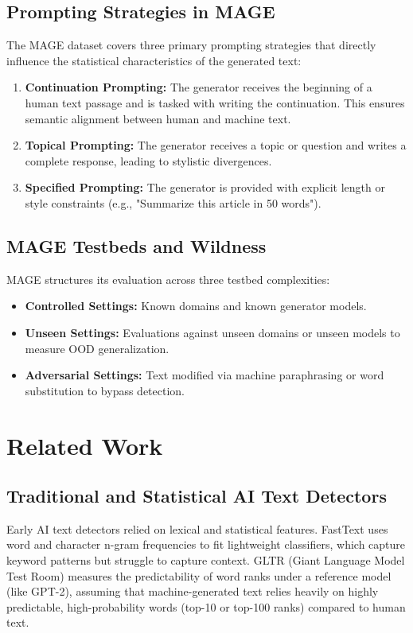 \documentclass[12pt,a4paper]{report}
\begin{document}
\section{Prompting Strategies in MAGE}
The MAGE dataset covers three primary prompting strategies that directly influence the statistical characteristics of the generated text:
\begin{enumerate}
    \item \textbf{Continuation Prompting:} The generator receives the beginning of a human text passage and is tasked with writing the continuation. This ensures semantic alignment between human and machine text.
    \item \textbf{Topical Prompting:} The generator receives a topic or question and writes a complete response, leading to stylistic divergences.
    \item \textbf{Specified Prompting:} The generator is provided with explicit length or style constraints (e.g., "Summarize this article in 50 words").
\end{enumerate}

\section{MAGE Testbeds and Wildness}
MAGE structures its evaluation across three testbed complexities:
\begin{itemize}
    \item \textbf{Controlled Settings:} Known domains and known generator models.
    \item \textbf{Unseen Settings:} Evaluations against unseen domains or unseen models to measure OOD generalization.
    \item \textbf{Adversarial Settings:} Text modified via machine paraphrasing or word substitution to bypass detection.
\end{itemize}

\chapter{Related Work}
\label{ch:related}

\section{Traditional and Statistical AI Text Detectors}
Early AI text detectors relied on lexical and statistical features. FastText \cite{joulin2016bag} uses word and character n-gram frequencies to fit lightweight classifiers, which capture keyword patterns but struggle to capture context. GLTR (Giant Language Model Test Room) \cite{gehrmann2019gltr} measures the predictability of word ranks under a reference model (like GPT-2), assuming that machine-generated text relies heavily on highly predictable, high-probability words (top-10 or top-100 ranks) compared to human text.
\end{document}
